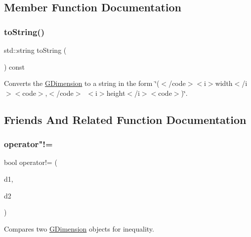 \subsection{Member Function Documentation}
\mbox{\label{structGDimension_a1fe5121d6528fdea3f243321b3fa3a49}} 
\subsubsection{\texorpdfstring{to\+String()}{toString()}}
{\footnotesize\ttfamily std\+::string to\+String (\begin{DoxyParamCaption}{ }\end{DoxyParamCaption}) const}



Converts the {\ttfamily \mbox{\hyperlink{structGDimension}{G\+Dimension}}} to a string in the form {\ttfamily \char`\"{}($<$/code$>$$<$i$>$width$<$/i$>$$<$code$>$,$<$/code$>$~$<$i$>$height$<$/i$>$$<$code$>$)\char`\"{}}. 



\subsection{Friends And Related Function Documentation}
\mbox{\label{structGDimension_a38754b56ceecfaa7cbf3947a19c8ceb6}} 
\subsubsection{\texorpdfstring{operator"!=}{operator!=}}
{\footnotesize\ttfamily bool operator!= (\begin{DoxyParamCaption}\item[{const \mbox{\hyperlink{structGDimension}{G\+Dimension}} \&}]{d1,  }\item[{const \mbox{\hyperlink{structGDimension}{G\+Dimension}} \&}]{d2 }\end{DoxyParamCaption})\hspace{0.3cm}{\ttfamily [friend]}}



Compares two \mbox{\hyperlink{structGDimension}{G\+Dimension}} objects for inequality. 

